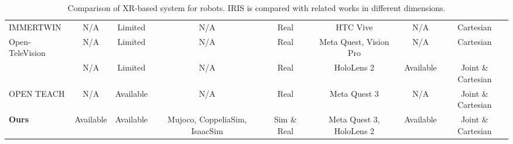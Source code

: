 \begin{table*}[t]
\begin{adjustbox}{max width=\textwidth}
\begin{tabular}{lccccccc}
        IMMERTWIN \cite{immertwin}                         & \textcolor{goodgray}{N/A}        & \textcolor{goodred}{Limited}      & \textcolor{goodgray}{N/A}     & \textcolor{goodred}{Real}          & \textcolor{goodred}{HTC Vive}     & \textcolor{goodgray}{N/A} & \textcolor{goodred}{Cartesian} \\
        Open-TeleVision \cite{opentelevision}              & \textcolor{goodgray}{N/A}        & \textcolor{goodred}{Limited}      & \textcolor{goodgray}{N/A}     & \textcolor{goodred}{Real}          & \textcolor{goodgreen}{Meta Quest, Vision Pro} & \textcolor{goodgray}{N/A} & \textcolor{goodred}{Cartesian} \\
        \citet{szczurek2023multimodal}                     & \textcolor{goodgray}{N/A}        & \textcolor{goodred}{Limited}      & \textcolor{goodgray}{N/A}     & \textcolor{goodred}{Real}          & \textcolor{goodred}{HoloLens 2}   & \textcolor{goodgreen}{Available} & \textcolor{goodred}{Joint \& Cartesian} \\
        OPEN TEACH \cite{openteach}                        & \textcolor{goodgray}{N/A}        & \textcolor{goodgreen}{Available}  & \textcolor{goodgray}{N/A}     & \textcolor{goodred}{Real}          & \textcolor{goodred}{Meta Quest 3} & \textcolor{goodred}{N/A} & \textcolor{goodgreen}{Joint \& Cartesian} \\
        \midrule
        \textbf{Ours}                                      & \textcolor{goodgreen}{Available} & \textcolor{goodgreen}{Available}  & \textcolor{goodgreen}{Mujoco, CoppeliaSim, IsaacSim} & \textcolor{goodgreen}{Sim \& Real} & \textcolor{goodgreen}{Meta Quest 3, HoloLens 2} & \textcolor{goodgreen}{Available} & \textcolor{goodgreen}{Joint \& Cartesian} \\
        \bottomrule
        \end{tabular}
    \end{adjustbox}
    \caption{Comparison of XR-based system for robots. IRIS is compared with related works in different dimensions.}
\end{table*}

